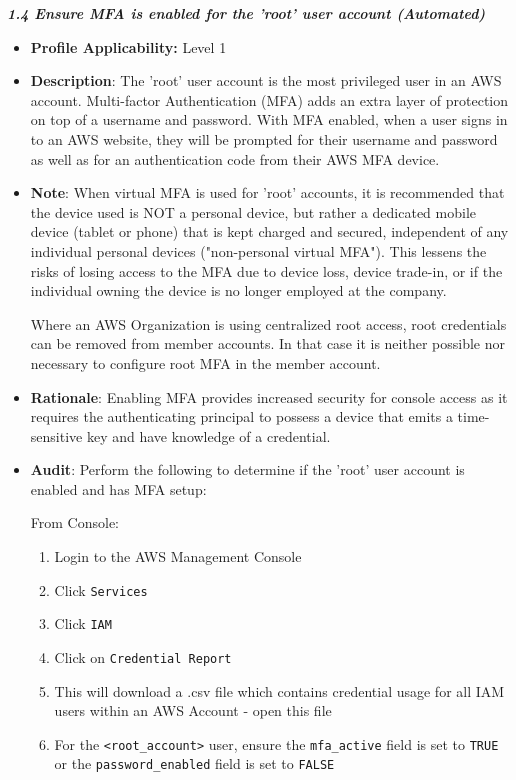 \begin{mdframed}[backgroundcolor=gray!05, linecolor=gray!50]
    \itshape
    \textbf{1.4 Ensure MFA is enabled for the 'root' user account (Automated)}
    \begin{itemize}
        \item \textbf{Profile Applicability:} Level 1
        \item \textbf{Description}: The 'root' user account is the most privileged user in an AWS account. Multi-factor Authentication (MFA) adds an extra layer of protection on top of a username and password. With MFA enabled, when a user signs in to an AWS website, they will be prompted for their username and password as well as for an authentication code from their AWS MFA device.
        \item \textbf{Note}: When virtual MFA is used for 'root' accounts, it is recommended that the device used is NOT a personal device, but rather a dedicated mobile device (tablet or phone) that is kept charged and secured, independent of any individual personal devices ("non-personal virtual MFA"). This lessens the risks of losing access to the MFA due to device loss, device trade-in, or if the individual owning the device is no longer employed at the company.
        
        Where an AWS Organization is using centralized root access, root credentials can be removed from member accounts. In that case it is neither possible nor necessary to configure root MFA in the member account.

        \item \textbf{Rationale}: Enabling MFA provides increased security for console access as it requires the authenticating principal to possess a device that emits a time-sensitive key and have knowledge of a credential.
        
        \item \textbf{Audit}: Perform the following to determine if the 'root' user account is enabled and has MFA setup:
        
        From Console:
        \begin{enumerate}
            \item Login to the AWS Management Console
            \item Click \texttt{Services}
            \item Click \texttt{IAM}
            \item Click on \texttt{Credential Report}
            \item This will download a .csv file which contains credential usage for all IAM users within an AWS Account - open this file
            \item For the \texttt{<root\_account>} user, ensure the \texttt{mfa\_active} field is set to \texttt{TRUE} or the \texttt{password\_enabled} field is set to \texttt{FALSE}
        \end{enumerate}


\end{itemize}
\end{mdframed}
